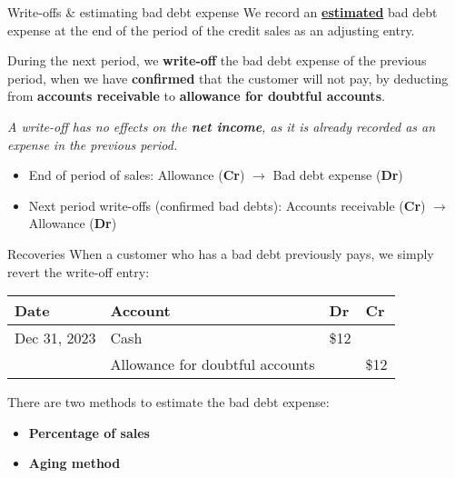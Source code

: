 \begin{knBox}
    {Write-offs \& estimating bad debt expense}
    We record an \hyperref[thm:bad_debt_est]{\textbf{estimated}} bad debt expense at the end of the period of the credit sales as an adjusting entry.

    \vspace{0.3em}

    During the next period, we \textbf{write-off} the bad debt expense of the previous period, when we have \textbf{confirmed} that the customer will not pay, by deducting from \textbf{accounts receivable} to \textbf{allowance for doubtful accounts}.

    \vspace{0.3em}

    \textit{A write-off has no effects on the \textbf{net income}, as it is already recorded as an expense in the previous period.}

    \begin{itemize}
        \item End of period of sales: Allowance (\textbf{Cr}) $\rightarrow$ Bad debt expense (\textbf{Dr})
        \item Next period write-offs (confirmed bad debts): Accounts receivable (\textbf{Cr}) $\rightarrow$ Allowance (\textbf{Dr})
    \end{itemize}

\end{knBox}

\begin{knBox}
    {Recoveries}
    When a customer who has a bad debt previously pays, we simply revert the write-off entry:

    \vspace{1em}

    \begin{tabular}{llll}
        \textbf{Date} & \textbf{Account}                      & \textbf{Dr} & \textbf{Cr} \\
        \hline
        Dec 31, 2023  & Cash                                  & \$12        &             \\
                      & \quad Allowance for doubtful accounts &             & \$12        \\
    \end{tabular}
\end{knBox}

There are two methods to estimate the bad debt expense:
\begin{itemize}
    \item \textbf{Percentage of sales}
    \item \textbf{Aging method}
\end{itemize}
\label{thm:bad_debt_est}


